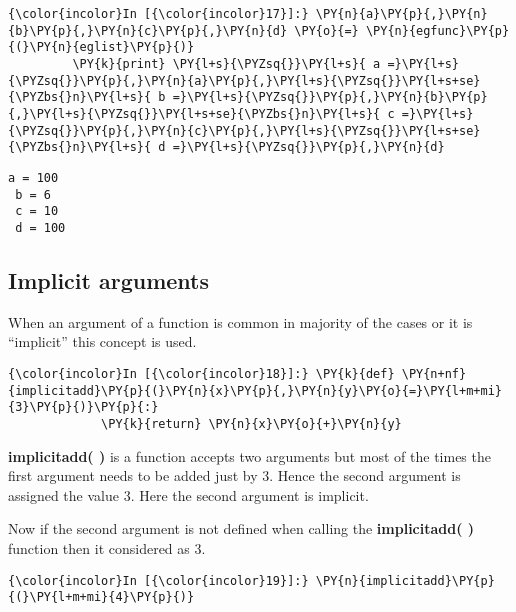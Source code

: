     \begin{Verbatim}[commandchars=\\\{\}]
{\color{incolor}In [{\color{incolor}17}]:} \PY{n}{a}\PY{p}{,}\PY{n}{b}\PY{p}{,}\PY{n}{c}\PY{p}{,}\PY{n}{d} \PY{o}{=} \PY{n}{egfunc}\PY{p}{(}\PY{n}{eglist}\PY{p}{)}
         \PY{k}{print} \PY{l+s}{\PYZsq{}}\PY{l+s}{ a =}\PY{l+s}{\PYZsq{}}\PY{p}{,}\PY{n}{a}\PY{p}{,}\PY{l+s}{\PYZsq{}}\PY{l+s+se}{\PYZbs{}n}\PY{l+s}{ b =}\PY{l+s}{\PYZsq{}}\PY{p}{,}\PY{n}{b}\PY{p}{,}\PY{l+s}{\PYZsq{}}\PY{l+s+se}{\PYZbs{}n}\PY{l+s}{ c =}\PY{l+s}{\PYZsq{}}\PY{p}{,}\PY{n}{c}\PY{p}{,}\PY{l+s}{\PYZsq{}}\PY{l+s+se}{\PYZbs{}n}\PY{l+s}{ d =}\PY{l+s}{\PYZsq{}}\PY{p}{,}\PY{n}{d}
\end{Verbatim}

    \begin{Verbatim}[commandchars=\\\{\}]
a = 100 
 b = 6 
 c = 10 
 d = 100
    \end{Verbatim}

    \subsection{Implicit arguments}\label{implicit-arguments}

    When an argument of a function is common in majority of the cases or it
is ``implicit'' this concept is used.

    \begin{Verbatim}[commandchars=\\\{\}]
{\color{incolor}In [{\color{incolor}18}]:} \PY{k}{def} \PY{n+nf}{implicitadd}\PY{p}{(}\PY{n}{x}\PY{p}{,}\PY{n}{y}\PY{o}{=}\PY{l+m+mi}{3}\PY{p}{)}\PY{p}{:}
             \PY{k}{return} \PY{n}{x}\PY{o}{+}\PY{n}{y}
\end{Verbatim}

    \textbf{implicitadd( )} is a function accepts two arguments but most of
the times the first argument needs to be added just by 3. Hence the
second argument is assigned the value 3. Here the second argument is
implicit.

    Now if the second argument is not defined when calling the
\textbf{implicitadd( )} function then it considered as 3.

    \begin{Verbatim}[commandchars=\\\{\}]
{\color{incolor}In [{\color{incolor}19}]:} \PY{n}{implicitadd}\PY{p}{(}\PY{l+m+mi}{4}\PY{p}{)}
\end{Verbatim}

